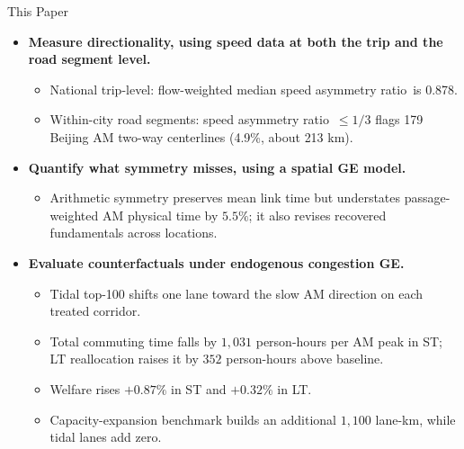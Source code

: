 \documentclass[11pt,aspectratio=169]{beamer}
\newcommand{\good}[1]{\textcolor{blue!70!black}{#1}}
\newcommand{\bad}[1]{\textcolor{red!70!black}{#1}}
\newcommand{\SAR}{speed asymmetry ratio}
\begin{document}
\begin{frame}{This Paper}
\small
\begin{itemize}
  \item \textbf{Measure directionality, using speed data at both the trip and the road segment level.}
  \begin{itemize}\footnotesize
    \item National trip-level: flow-weighted median \SAR\ is \good{0.878}.
    \item Within-city road segments: \SAR\ $\leq1/3$ flags \good{179} Beijing AM two-way centerlines (\good{4.9\%}, about \good{213 km}).
  \end{itemize}
  \item \textbf{Quantify what symmetry misses, using a spatial GE model.}
  \begin{itemize}\footnotesize
    \item Arithmetic symmetry preserves mean link time but understates passage-weighted AM physical time by \good{$5.5\%$}; it also revises recovered fundamentals across locations.
  \end{itemize}
  \item \textbf{Evaluate counterfactuals under endogenous congestion GE.}
  \begin{itemize}\footnotesize
    \item Tidal top-100 shifts one lane toward the slow AM direction on each treated corridor.
    \item Total commuting time falls by \good{$1{,}031$ person-hours per AM peak} in ST; LT reallocation raises it by \bad{$352$ person-hours} above baseline.
    \item Welfare rises \good{$+0.87\%$} in ST and \good{$+0.32\%$} in LT.
    \item Capacity-expansion benchmark builds an additional \good{$1{,}100$ lane-km}, while tidal lanes add \good{zero}.
  \end{itemize}
\end{itemize}
\end{frame}
\end{document}
